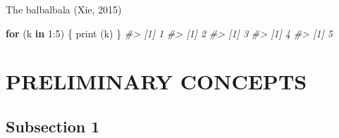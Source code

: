 \documentclass{source/tex/templates/maththesis}
\newenvironment{Shaded}{\begin{snugshade}}{\end{snugshade}}
\newcommand{\CommentTok}[1]{\textcolor[rgb]{0.56,0.35,0.01}{\textit{#1}}}
\newcommand{\ControlFlowTok}[1]{\textcolor[rgb]{0.13,0.29,0.53}{\textbf{#1}}}
\newcommand{\DecValTok}[1]{\textcolor[rgb]{0.00,0.00,0.81}{#1}}
\newcommand{\FunctionTok}[1]{\textcolor[rgb]{0.00,0.00,0.00}{#1}}
\newcommand{\NormalTok}[1]{#1}
\newcommand{\SpecialCharTok}[1]{\textcolor[rgb]{0.00,0.00,0.00}{#1}}
\begin{document}
The balbalbala (Xie, 2015)

\begin{Shaded}
\begin{Highlighting}[]
\ControlFlowTok{for}\NormalTok{ (k }\ControlFlowTok{in} \DecValTok{1}\SpecialCharTok{:}\DecValTok{5}\NormalTok{) \{}
  \FunctionTok{print}\NormalTok{ (k)}
\NormalTok{\}}
\CommentTok{\#\textgreater{} [1] 1}
\CommentTok{\#\textgreater{} [1] 2}
\CommentTok{\#\textgreater{} [1] 3}
\CommentTok{\#\textgreater{} [1] 4}
\CommentTok{\#\textgreater{} [1] 5}
\end{Highlighting}
\end{Shaded}

\hypertarget{preliminary-concepts}{%
\chapter{PRELIMINARY CONCEPTS}\label{preliminary-concepts}}

\hypertarget{subsection-1-1}{%
\section{Subsection 1}\label{subsection-1-1}}
\end{document}
